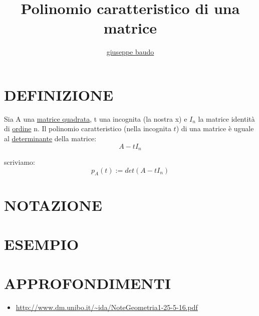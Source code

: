\documentclass[a4paper,10pt]{article}
\title{Polinomio caratteristico di una matrice}
\author{\href{http://www.baudo.hol.es}{giuseppe baudo}}
\begin{document}
\maketitle

\section{DEFINIZIONE}
Sia A una \href{./MatriceQuadrata.html}{matrice quadrata}, t una incognita (la nostra x) e $I_n$ la matrice identità di \href{./OrdineMatrice.html}{ordine} n. Il polinomio caratteristico (nella incognita $t$) di una matrice è uguale al \href{./DeterminanteMatrice.html}{determinante} della matrice:
\[
 A-tI_n
\]

scriviamo:
\[
 p_A(t) := det(A-tI_n)
\]

\section{NOTAZIONE}

\section{ESEMPIO}

\section{APPROFONDIMENTI}
\begin{itemize}
 \item \url{http://www.dm.unibo.it/~ida/NoteGeometria1-25-5-16.pdf}
\end{itemize}
\end{document}
